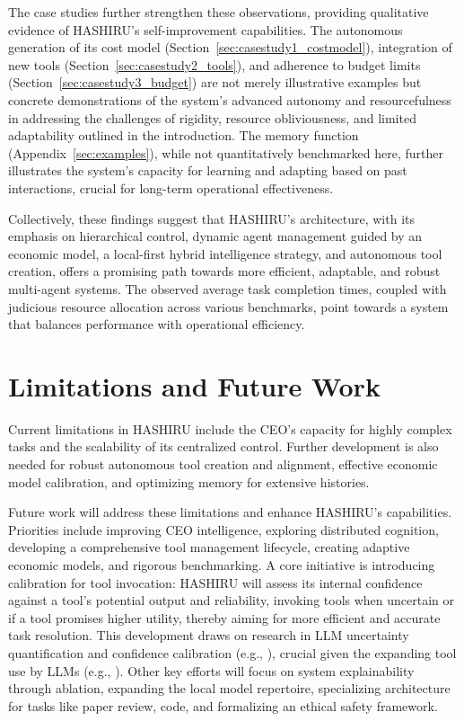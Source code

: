 \documentclass[conference]{IEEEtran}
\begin{document}
The case studies further strengthen these observations, providing qualitative evidence of HASHIRU's self-improvement capabilities. The autonomous generation of its cost model (Section~\ref{sec:casestudy1_costmodel}), integration of new tools (Section~\ref{sec:casestudy2_tools}), and adherence to budget limits (Section~\ref{sec:casestudy3_budget}) are not merely illustrative examples but concrete demonstrations of the system's advanced autonomy and resourcefulness in addressing the challenges of rigidity, resource obliviousness, and limited adaptability outlined in the introduction. The memory function (Appendix~\ref{sec:examples}), while not quantitatively benchmarked here, further illustrates the system's capacity for learning and adapting based on past interactions, crucial for long-term operational effectiveness.

Collectively, these findings suggest that HASHIRU's architecture, with its emphasis on hierarchical control, dynamic agent management guided by an economic model, a local-first hybrid intelligence strategy, and autonomous tool creation, offers a promising path towards more efficient, adaptable, and robust multi-agent systems. The observed average task completion times, coupled with judicious resource allocation across various benchmarks, point towards a system that balances performance with operational efficiency.

\section{Limitations and Future Work}
\label{sec:limitations_future_work}

Current limitations in HASHIRU include the CEO's capacity for highly complex tasks and the scalability of its centralized control. Further development is also needed for robust autonomous tool creation and alignment, effective economic model calibration, and optimizing memory for extensive histories.

Future work will address these limitations and enhance HASHIRU's capabilities. Priorities include improving CEO intelligence, exploring distributed cognition, developing a comprehensive tool management lifecycle, creating adaptive economic models, and rigorous benchmarking. A core initiative is introducing calibration for tool invocation: HASHIRU will assess its internal confidence against a tool's potential output and reliability, invoking tools when uncertain or if a tool promises higher utility, thereby aiming for more efficient and accurate task resolution. This development draws on research in LLM uncertainty quantification and confidence calibration (e.g., \cite{manggalaqa, spiess2024calibration}), crucial given the expanding tool use by LLMs (e.g., \cite{Qin2023ToolLLM}). Other key efforts will focus on system explainability through ablation, expanding the local model repertoire, specializing architecture for tasks like paper review, code, and formalizing an ethical safety framework.
\end{document}
